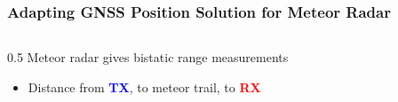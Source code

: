 \begin{frame}[label=adapting_gps]
    \frametitle{Adapting GNSS Position Solution for Meteor Radar}
    \begin{columns}
        \begin{column}{0.5\textwidth}
            Meteor radar gives \alert{bistatic range measurements} %
            \begin{itemize} \footnotesize %
                \item Distance from \textcolor{blue}{\textbf{TX}}, to meteor trail, to \textcolor{red}{\textbf{RX}}
            \end{itemize}



\end{column}
\end{columns}
\end{frame}
